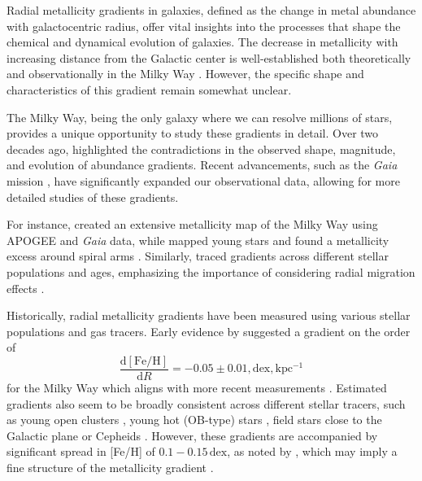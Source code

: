 \documentclass[fleqn,usenatbib]{mnras}
\begin{document}
Radial metallicity gradients in galaxies, defined as the change in metal abundance with galactocentric radius, offer vital insights into the processes that shape the chemical and dynamical evolution of galaxies. The decrease in metallicity with increasing distance from the Galactic center is well-established both theoretically \citep{Larson1976, Tinsley1980, Chiosi1980} and observationally in the Milky Way \citep{Searle1971, Janes1979, Twarog1997}. However, the specific shape and characteristics of this gradient remain somewhat unclear.

The Milky Way, being the only galaxy where we can resolve millions of stars, provides a unique opportunity to study these gradients in detail. Over two decades ago, \citet{Chiappini2002} highlighted the contradictions in the observed shape, magnitude, and evolution of abundance gradients. Recent advancements, such as the \textit{Gaia} mission \citep{Gaia-Collaboration2016}, have significantly expanded our observational data, allowing for more detailed studies of these gradients.

For instance, \citet{Hogg2019} created an extensive metallicity map of the Milky Way using APOGEE and \textit{Gaia} data, while \citet{Poggio2022} mapped young stars and found a metallicity excess around spiral arms \citep[see also][]{Zari2018, Zari2021, Poggio2021, Hackshaw2024}. Similarly, \citet[][among others]{Imig2023} traced gradients across different stellar populations and ages, emphasizing the importance of considering radial migration effects \citep{Binney2008, Frankel2018, Frankel2020}.

Historically, radial metallicity gradients have been measured using various stellar populations and gas tracers. Early evidence by \citet{Janes1979} suggested a gradient on the order of
\begin{equation}
\frac{\mathrm{d{[Fe/H]}}}{\mathrm{d}R} = -0.05 \pm 0.01,\mathrm{dex,kpc^{-1}}
\end{equation}
for the Milky Way which aligns with more recent measurements \citep{Anders2017, Hayden2015}. Estimated gradients also seem to be broadly consistent across different stellar tracers, such as young open clusters \citep[e.g.][]{Cunha2016, Magrini2017, Casamiquela2019, Donor2020, Spina2021,Myers2022}, young hot (OB-type) stars \citep{Zari2018, Zari2021, Poggio2021, Poggio2022}, field stars close to the Galactic plane \citep[e.g.][]{Bergemann2014} or Cepheids \citep{Andrievsky2002, Andrievsky2002b, Lemasle2007, Lemasle2013}. However, these gradients are accompanied by significant spread in [Fe/H] of $0.1-0.15\,\mathrm{dex}$, as noted by \citet{Twarog1980}, which may imply a fine structure of the metallicity gradient \citep[see][]{Genovali2014}.
\end{document}
